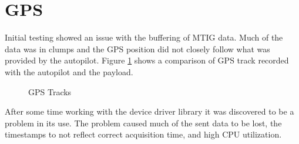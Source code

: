 \documentclass[a4paper,11pt]{report}
\begin{document}
\section{GPS}

Initial testing showed an issue with the buffering of MTIG data. Much of the data was in clumps and the GPS position did not closely follow what was provided by the autopilot. Figure \ref{fig:track_comp} shows a comparison of GPS track recorded with the autopilot and the payload.

\begin{figure}[ht]
  \centering
  \caption{GPS Tracks}
  \label{fig:track_comp}
\end{figure} 

After some time working with the device driver library it was discovered to be a problem in its use. The problem caused much of the sent data to be lost, the timestamps to not reflect correct acquisition time, and high CPU utilization. 
\end{document}
